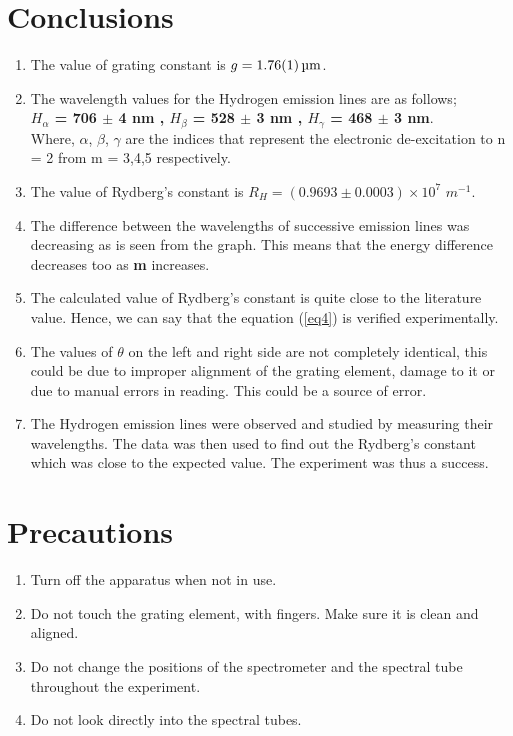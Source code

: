 \documentclass[%
 reprint,
 amsmath,amssymb,
 aps,
]{revtex4-2}
\begin{document}
\section{Conclusions}
\begin{enumerate}
    \item The value of grating constant is $g = \SI{1.76\pm0.01}{\micro \metre}$.
    \item The wavelength values for the Hydrogen emission lines are as follows; \\
    \textbf{$H_{\alpha}$ = 706 $\pm$ 4 nm , $H_{\beta}$ = 528 $\pm$ 3 nm , $H_{\gamma}$ = 468 $\pm$ 3 nm}. \\
    Where, $\alpha$, $\beta$, $\gamma$ are the indices that represent the electronic de-excitation to n = 2 from m = 3,4,5 respectively.
    \item The value of Rydberg's constant is $R_H = (0.9693 \pm 0.0003) \times 10^7$ $m^{-1}$.
    \item The difference between the wavelengths of successive emission lines was decreasing as is seen from the graph. This means that the energy difference decreases too as \textbf{m} increases.
    \item The calculated value of Rydberg's constant is quite close to the literature value. Hence, we can say that the equation (\ref{eq4}) is verified experimentally.
    \item The values of $\theta$ on the left and right side are not completely identical, this could be due to improper alignment of the grating element, damage to it or due to manual errors in reading. This could be a source of error.
    \item The Hydrogen emission lines were observed and studied by measuring their wavelengths. The data was then used to find out the Rydberg's constant which was close to the expected value. The experiment was thus a success.
\end{enumerate}

\section{Precautions}
\begin{enumerate}
    \item Turn off the apparatus when not in use.
    \item Do not touch the grating element, with fingers. Make sure it is clean and aligned.
    \item Do not change the positions of the spectrometer and the spectral tube throughout
    the experiment.
    \item Do not look directly into the spectral tubes.
\end{enumerate}




\end{document}
